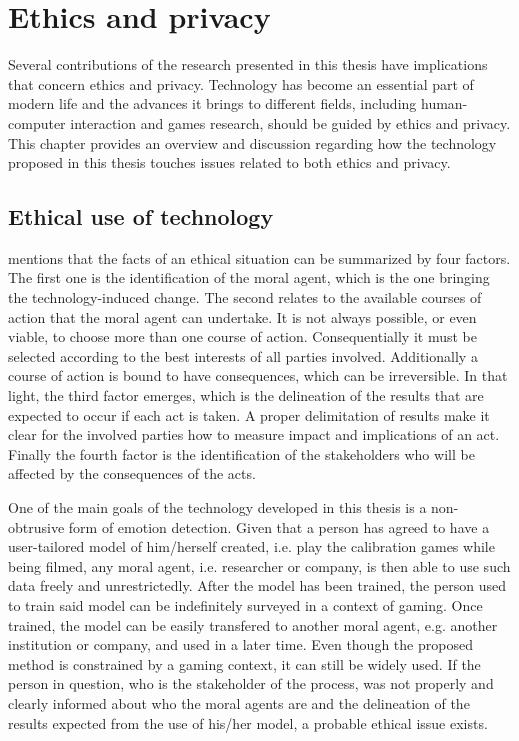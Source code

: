 \chapter{Ethics and privacy}
\label{ch:ethics}

Several contributions of the research presented in this thesis have implications that concern ethics and privacy. Technology has become an essential part of modern life and the advances it brings to different fields, including human-computer interaction and games research, should be guided by ethics and privacy. This chapter provides an overview and discussion regarding how the technology proposed in this thesis touches issues related to both ethics and privacy.

\section{Ethical use of technology}

\textcite{mason1995applying} mentions that the facts of an ethical situation can be summarized by four factors. The first one is the identification of the moral agent, which is the one bringing the technology-induced change. The second relates to the available courses of action that the moral agent can undertake. It is not always possible, or even viable, to choose more than one course of action. Consequentially it must be selected according to the best interests of all parties involved. Additionally a course of action is bound to have consequences, which can be irreversible. In that light, the third factor emerges, which is the delineation of the results that are expected to occur if each act is taken. A proper delimitation of results make it clear for the involved parties how to measure impact and implications of an act. Finally the fourth factor is the identification of the stakeholders who will be affected by the consequences of the acts.

One of the main goals of the technology developed in this thesis is a non-obtrusive form of emotion detection. Given that a person has agreed to have a user-tailored model of him/herself created, i.e. play the calibration games while being filmed, any moral agent, i.e. researcher or company, is then able to use such data freely and unrestrictedly. After the model has been trained, the person used to train said model can be indefinitely surveyed in a context of gaming. Once trained, the model can be easily transfered to another moral agent, e.g. another institution or company, and used in a later time. Even though the proposed method is constrained by a gaming context, it can still be widely used. If the person in question, who is the stakeholder of the process, was not properly and clearly informed about who the moral agents are and the delineation of the results expected from the use of his/her model, a probable ethical issue exists.

